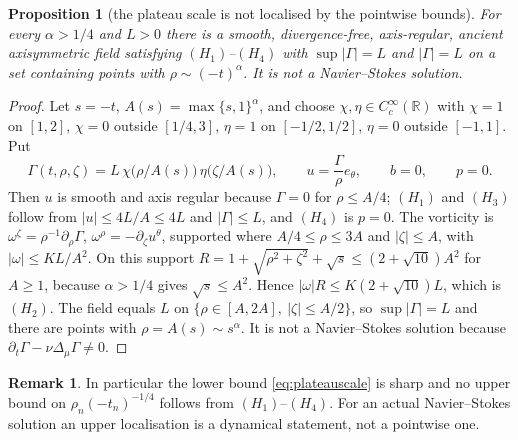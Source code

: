 \documentclass[11pt]{article}
\newtheorem{proposition}[theorem]{Proposition}
\theoremstyle{definition}
\newtheorem{remark}[theorem]{Remark}
\newcommand{\R}{\mathbb{R}}
\begin{document}
\begin{proposition}[the plateau scale is not localised by the pointwise bounds]
\label{prop:plateauscales}
For every $\alpha>1/4$ and $L>0$ there is a smooth, divergence-free,
axis-regular, ancient axisymmetric field satisfying $(H_1)$--$(H_4)$ with
$\sup|\Gamma|=L$ and $|\Gamma|=L$ on a set containing points with
$\rho\sim(-t)^\alpha$. It is not a Navier--Stokes solution.
\end{proposition}
\begin{proof}
Let $s=-t$, $A(s)=\max\{s,1\}^\alpha$, and choose
$\chi,\eta\in C_c^\infty(\R)$ with $\chi=1$ on $[1,2]$, $\chi=0$ outside
$[1/4,3]$, $\eta=1$ on $[-1/2,1/2]$, $\eta=0$ outside $[-1,1]$. Put
\begin{equation}
\Gamma(t,\rho,\zeta)=L\,\chi\bigl(\rho/A(s)\bigr)\,
\eta\bigl(\zeta/A(s)\bigr),\qquad
u=\frac{\Gamma}{\rho}e_\theta,\qquad b=0,\qquad p=0.
\end{equation}
Then $u$ is smooth and axis regular because $\Gamma=0$ for $\rho\le A/4$;
$(H_1)$ and $(H_3)$ follow from $|u|\le4L/A\le4L$ and $|\Gamma|\le L$, and
$(H_4)$ is $p=0$. The vorticity is
$\omega^\zeta=\rho^{-1}\partial_\rho\Gamma$,
$\omega^\rho=-\partial_\zeta u^\theta$, supported where
$A/4\le\rho\le3A$ and $|\zeta|\le A$, with $|\omega|\le K L/A^2$. On this
support $R=1+\sqrt{\rho^2+\zeta^2}+\sqrt s\le(2+\sqrt{10})A^2$ for $A\ge1$,
because $\alpha>1/4$ gives $\sqrt s\le A^2$. Hence
$|\omega|R\le K(2+\sqrt{10})L$, which is $(H_2)$. The field equals $L$ on
$\{\rho\in[A,2A],\ |\zeta|\le A/2\}$, so $\sup|\Gamma|=L$ and there are
points with $\rho=A(s)\sim s^\alpha$. It is not a Navier--Stokes solution
because $\partial_t\Gamma-\nu\Delta_\mu\Gamma\ne0$.
\end{proof}

\begin{remark}
In particular the lower bound \eqref{eq:plateauscale} is sharp and no upper
bound on $\rho_n(-t_n)^{-1/4}$ follows from $(H_1)$--$(H_4)$. For an actual
Navier--Stokes solution an upper localisation is a dynamical statement, not a
pointwise one.
\end{remark}
\end{document}
